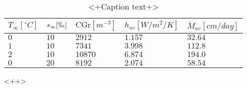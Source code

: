 	\begin{table}
	  \centering
	  \begin{tabular}{lllll}
	    $T_\infty [\unit{^\circ C}]$ & $s_\infty [\permil]$ & $\text{CGr} [\unit{m^{-3}}]$ & $h_{av} [\unit{W/m^2/K}]$ & $\dot{M}_{av} [\unit{cm/day}]$ \\
	    \hline
	    $0$ & $10$ & $2912$ & $1.157$ & $32.64$ \\
	    $1$ & $10$ & $7341$ & $3.998$ & $112.8$ \\
	    $2$ & $10$ & $10870$ & $6.874$ & $194.0$ \\
	    $0$ & $20$ & $8192$ & $2.074$ & $58.54$ \\
	  \end{tabular}
	  \caption{<+Caption text+>}
	  \label{tab:<+label+>}
	\end{table}<++>

